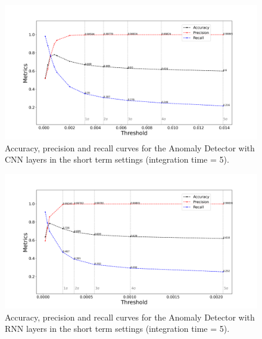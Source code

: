 \begin{figure}[!htb]
    \centering
    \includegraphics[width=\linewidth]{figures/experiments/metrics/cnn_metrics_test_set_all_itime_5.png}
    \caption{Accuracy, precision and recall curves for the Anomaly Detector with CNN layers in the short term settings (integration time = 5).}
    \label{fig:cnn-metrics-itime-5}
\end{figure}

\begin{figure}[!htb]
    \centering
    \includegraphics[width=\linewidth]{figures/experiments/metrics/rnn_metrics_test_set_all_itime_5.png}
    \caption{Accuracy, precision and recall curves for the Anomaly Detector with RNN layers in the short term settings (integration time = 5).}
    \label{fig:rnn-metrics-itime-5}
\end{figure}

